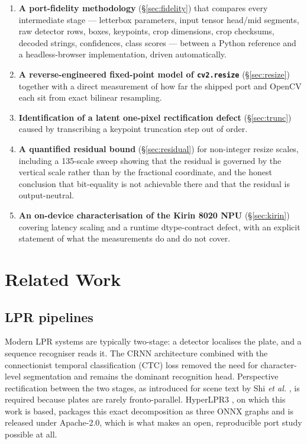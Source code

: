 \documentclass[journal]{IEEEtran}
\begin{document}
\begin{enumerate}
\item \textbf{A port-fidelity methodology} (\S\ref{sec:fidelity}) that compares
every intermediate stage --- letterbox parameters, input tensor head/mid
segments, raw detector rows, boxes, keypoints, crop dimensions, crop checksums,
decoded strings, confidences, class scores --- between a Python reference and a
headless-browser implementation, driven automatically.
\item \textbf{A reverse-engineered fixed-point model of \texttt{cv2.resize}}
(\S\ref{sec:resize}) together with a direct measurement of how far the shipped
port and OpenCV each sit from exact bilinear resampling.
\item \textbf{Identification of a latent one-pixel rectification defect}
(\S\ref{sec:trunc}) caused by transcribing a keypoint truncation step out of
order.
\item \textbf{A quantified residual bound} (\S\ref{sec:residual}) for
non-integer resize scales, including a 135-scale sweep showing that the residual
is governed by the vertical scale rather than by the fractional coordinate, and
the honest conclusion that bit-equality is not achievable there and that the
residual is output-neutral.
\item \textbf{An on-device characterisation of the Kirin 8020 NPU}
(\S\ref{sec:kirin}) covering latency scaling and a runtime dtype-contract defect,
with an explicit statement of what the measurements do and do not cover.
\end{enumerate}

\section{Related Work}

\subsection{LPR pipelines}
Modern LPR systems are typically two-stage: a detector localises the plate, and a
sequence recogniser reads it. The CRNN architecture combined with the
connectionist temporal classification (CTC) loss \cite{graves2006} removed the
need for character-level segmentation and remains the dominant recognition head.
Perspective rectification between the two stages, as introduced for scene text by
Shi \emph{et al.} \cite{shi2016}, is required because plates are rarely
fronto-parallel. HyperLPR3 \cite{hyperlpr}, on which this work is based, packages
this exact decomposition as three ONNX graphs and is released under Apache-2.0,
which is what makes an open, reproducible port study possible at all.
\end{document}

